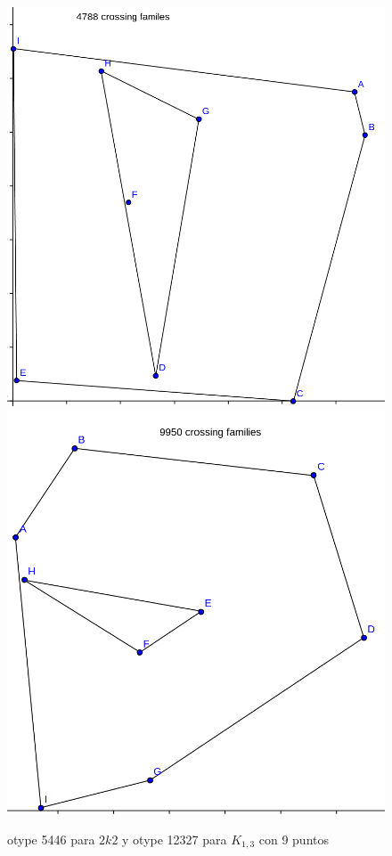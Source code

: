 \documentclass[11pt,epsf,times,letterpaper]{article}
\begin{document}
	\begin{figure}[!h]
		\centering
		\includegraphics[scale=.65]{2k2/max9_otype5446.png}
		\hspace{10mm}
		\includegraphics[scale=.65]{k13/max9_otype12327.png}
		\caption{otype 5446 para $2k2$ y otype 12327 para $K_{1,3}$ con 9 puntos}
	\end{figure}	
	
\end{document}
